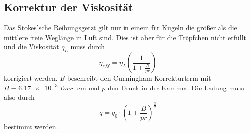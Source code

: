 \subsection{Korrektur der Viskosität}
\label{ssec:Viskositaet}
Das Stokes'sche Reibungsgetzt gilt nur in einem für Kugeln die größer als die mittlere freie Weglänge in Luft sind.
Dies ist aber für die Tröpfchen nicht erfüllt und die Viskosität $\eta_L$ muss durch
\begin{equation}
    \label{eqn:Viskositaet}
    \eta_{eff}=\eta_L\left(\frac{1}{1+\frac{B}{pr}}\right)
\end{equation}
korrigiert werden. $B$ beschreibt den Cunningham Korrekturterm mit $B=\qty{6.17e-3}{Torr\cdot \centi\meter}$ und $p$ den Druck in der Kammer.
Die Ladung muss also durch
\begin{equation}
    \label{eqn:Ladung}
    q=q_0\cdot \left( 1+\frac{B}{pr}\right)^{\frac{3}{2}}
\end{equation}
bestimmt werden.
































